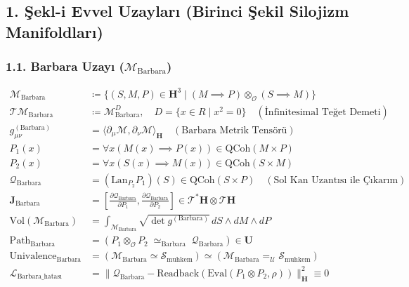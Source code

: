 \documentclass[11pt, a4paper]{article}
\begin{document}
\subsection{1. Şekl-i Evvel Uzayları (Birinci Şekil Silojizm Manifoldları)}

\subsubsection{1.1. Barbara Uzayı ($\mathcal{M}_{\text{Barbara}}$)}
\begin{align}
\mathcal{M}_{\text{Barbara}} &\coloneqq \{ (S, M, P) \in \mathbf{H}^3 \mid (M \implies P) \otimes_{\mathcal{O}} (S \implies M) \} \\
\mathcal{T}\mathcal{M}_{\text{Barbara}} &\coloneqq \mathcal{M}_{\text{Barbara}}^D, \quad D = \{x \in R \mid x^2 = 0\} \quad (\text{İnfinitesimal Teğet Demeti}) \\
g_{\mu\nu}^{(\text{Barbara})} &= \langle \partial_\mu \mathcal{M}, \partial_\nu \mathcal{M} \rangle_{\mathbf{H}} \quad (\text{Barbara Metrik Tensörü}) \\
P_1(x) &= \forall x (M(x) \implies P(x)) \in \text{QCoh}(M \times P) \\
P_2(x) &= \forall x (S(x) \implies M(x)) \in \text{QCoh}(S \times M) \\
\mathcal{Q}_{\text{Barbara}} &= (\text{Lan}_{P_2} P_1)(S) \in \text{QCoh}(S \times P) \quad (\text{Sol Kan Uzantısı ile Çıkarım}) \\
\mathbf{J}_{\text{Barbara}} &= \left[ \frac{\partial \mathcal{Q}_{\text{Barbara}}}{\partial P_1}, \frac{\partial \mathcal{Q}_{\text{Barbara}}}{\partial P_2} \right] \in \mathcal{T}^*\mathbf{H} \otimes \mathcal{T}\mathbf{H} \\
\text{Vol}(\mathcal{M}_{\text{Barbara}}) &= \int_{\mathcal{M}_{\text{Barbara}}} \sqrt{\det g^{(\text{Barbara})}} \, dS \wedge dM \wedge dP \\
\text{Path}_{\text{Barbara}} &= (P_1 \otimes_{\mathcal{O}} P_2 \;\simeq_{\text{Barbara}}\; \mathcal{Q}_{\text{Barbara}}) \in \mathbf{U} \\
\text{Univalence}_{\text{Barbara}} &= (\mathcal{M}_{\text{Barbara}} \simeq \mathcal{S}_{\text{muhkem}}) \simeq (\mathcal{M}_{\text{Barbara}} =_{\mathcal{U}} \mathcal{S}_{\text{muhkem}}) \\
\mathcal{L}_{\text{Barbara\_hatası}} &= \| \mathcal{Q}_{\text{Barbara}} - \text{Readback}(\text{Eval}(P_1 \otimes P_2, \rho)) \|_{\mathbf{H}}^2 \equiv 0
\end{align}
\end{document}
